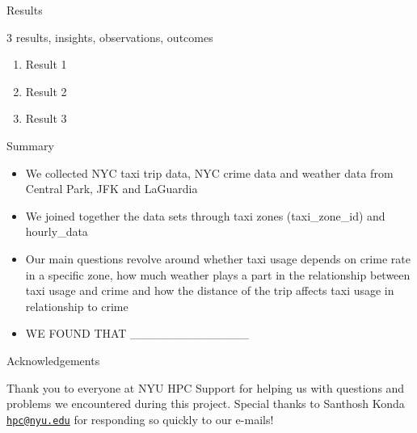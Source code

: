 \documentclass[10pt,ignorenonframetext,]{beamer}
\providecommand{\tightlist}{%
  \setlength{\itemsep}{0pt}\setlength{\parskip}{0pt}}
\begin{document}
\begin{frame}{%
\protect\hypertarget{results}{%
Results}}

3 results, insights, observations, outcomes

\begin{enumerate}
[1.]
\item
  Result 1
\item
  Result 2
\item
  Result 3
\end{enumerate}

\end{frame}

\begin{frame}{%
\protect\hypertarget{summary}{%
Summary}}

\begin{itemize}
\tightlist
\item
  We collected NYC taxi trip data, NYC crime data and weather data from
  Central Park, JFK and LaGuardia
\item
  We joined together the data sets through taxi zones (taxi\_zone\_id)
  and hourly\_data
\item
  Our main questions revolve around whether taxi usage depends on crime
  rate in a specific zone, how much weather plays a part in the
  relationship between taxi usage and crime and how the distance of the
  trip affects taxi usage in relationship to crime
\item
  WE FOUND THAT \_\_\_\_\_\_\_\_\_\_\_\_\_\_
\end{itemize}

\end{frame}

\begin{frame}{%
\protect\hypertarget{acknowledgements}{%
Acknowledgements}}

Thank you to everyone at NYU HPC Support for helping us with questions
and problems we encountered during this project. Special thanks to
Santhosh Konda \href{mailto:hpc@nyu.edu}{\nolinkurl{hpc@nyu.edu}} for
responding so quickly to our e-mails!

\end{frame}
\end{document}
